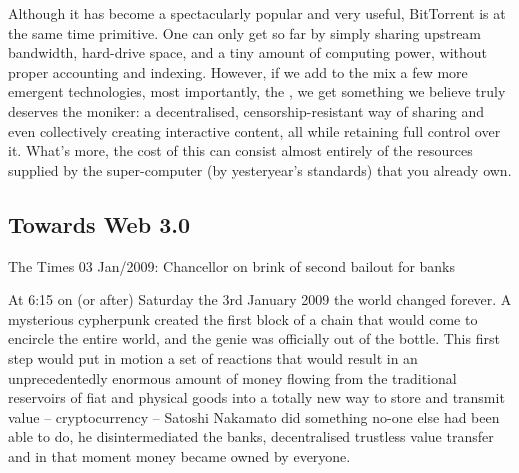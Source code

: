 Although it has become a spectacularly popular and very useful, BitTorrent is at the same time primitive. One can only get so far by simply sharing upstream bandwidth, hard-drive space, and a tiny amount of computing power, without proper accounting and indexing. However, if we add to the mix a few more emergent technologies, most importantly, the , we get something we believe truly deserves the  moniker: a decentralised, censorship-resistant way of sharing and even collectively creating interactive content, all while retaining full control over it. What's more, the cost of this can consist almost entirely of the resources supplied by the super-computer (by yesteryear's standards) that you already own.

\subsection{Towards Web 3.0 \statusgreen}\label{sec:towards-web3}


\begin{displayquote}
The Times 03 Jan/2009: Chancellor on brink of second bailout for banks
\end{displayquote}

At 6:15 on (or after) Saturday the 3rd January 2009 the world changed forever. A mysterious cypherpunk created the first block of a chain that would come to encircle the entire world, and the genie was officially out of the bottle. This first step would put in motion a set of reactions that would result in an unprecedentedly enormous amount of money flowing from the traditional reservoirs of fiat and physical goods into a totally new way to store and transmit value -- cryptocurrency -- Satoshi Nakamato did something no-one else had been able to do, he disintermediated the banks, decentralised trustless value transfer and in that moment money became owned by everyone.

